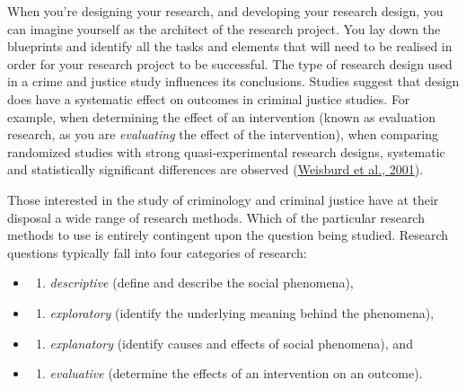 \documentclass[
]{book}
\providecommand{\tightlist}{%
  \setlength{\itemsep}{0pt}\setlength{\parskip}{0pt}}
\begin{document}
When you're designing your research, and developing your research design, you can imagine yourself as the architect of the research project. You lay down the blueprints and identify all the tasks and elements that will need to be realised in order for your research project to be successful. The type of research design used in a crime and justice study influences its conclusions. Studies suggest that design does have a systematic effect on outcomes in criminal justice studies. For example, when determining the effect of an intervention (known as evaluation research, as you are \emph{evaluating} the effect of the intervention), when comparing randomized studies with strong quasi-experimental research designs, systematic and statistically significant differences are observed (\href{http://cebcp.org/wp-content/publications/Does\%20Research\%20Design\%20Affect\%20Study\%20Outcomes.pdf}{Weisburd et al., 2001}).

Those interested in the study of criminology and criminal justice have at their disposal a wide range of research methods. Which of the particular research methods to use is entirely contingent upon the question being studied. Research questions typically fall into four categories of research:

\begin{itemize}
\item
  \begin{enumerate}
  \def\labelenumi{(\arabic{enumi})}
  \tightlist
  \item
    \emph{descriptive} (define and describe the social phenomena),
  \end{enumerate}
\item
  \begin{enumerate}
  \def\labelenumi{(\arabic{enumi})}
  \setcounter{enumi}{1}
  \tightlist
  \item
    \emph{exploratory} (identify the underlying meaning behind the phenomena),
  \end{enumerate}
\item
  \begin{enumerate}
  \def\labelenumi{(\arabic{enumi})}
  \setcounter{enumi}{2}
  \tightlist
  \item
    \emph{explanatory} (identify causes and effects of social phenomena), and
  \end{enumerate}
\item
  \begin{enumerate}
  \def\labelenumi{(\arabic{enumi})}
  \setcounter{enumi}{3}
  \tightlist
  \item
    \emph{evaluative} (determine the effects of an intervention on an outcome).
  \end{enumerate}
\end{itemize}
\end{document}
